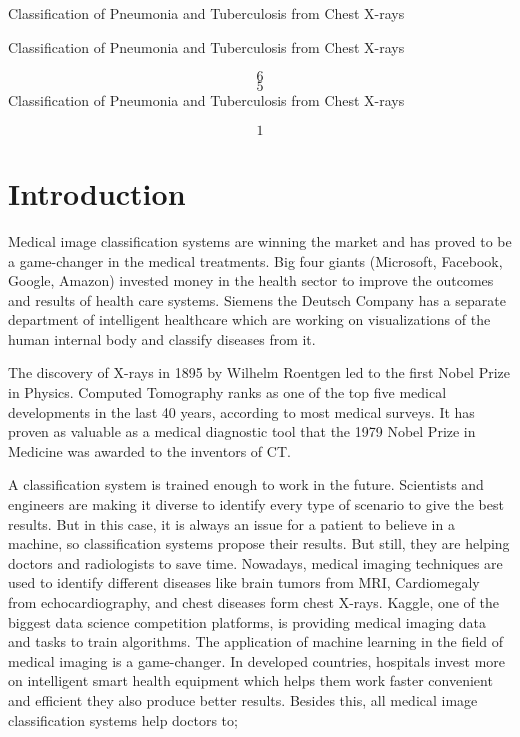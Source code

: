 \documentclass{article} %
\begin{document}
 Classification of Pneumonia and Tuberculosis from Chest X-rays

\noindent 

\noindent Classification of Pneumonia and Tuberculosis from Chest X-rays

\noindent 
\[6\] 
\[5\] 
Classification of Pneumonia and Tuberculosis from Chest X-rays

\noindent 
\[1\] 



\section{ Introduction}

\noindent Medical image classification systems are winning the market and has proved to be a game-changer in the medical treatments. Big four giants (Microsoft, Facebook, Google, Amazon) invested money in the health sector to improve the outcomes and results of health care systems. Siemens the Deutsch Company has a separate department of intelligent healthcare which are working on visualizations of the human internal body and classify diseases from it.

\noindent The discovery of X-rays in 1895 by Wilhelm Roentgen led to the first Nobel Prize in Physics. Computed Tomography ranks as one of the top five medical developments in the last 40 years, according to most medical surveys. It has proven as valuable as a medical diagnostic tool that the 1979 Nobel Prize in Medicine was awarded to the inventors of CT.

\noindent A classification system is trained enough to work in the future. Scientists and engineers are making it diverse to identify every type of scenario to give the best results. But in this case, it is always an issue for a patient to believe in a machine, so classification systems propose their results. But still, they are helping doctors and radiologists to save time. Nowadays, medical imaging techniques are used to identify different diseases like brain tumors from MRI, Cardiomegaly from echocardiography, and chest diseases form chest X-rays. Kaggle, one of the biggest data science competition platforms, is providing medical imaging data and tasks to train algorithms. The application of machine learning in the field of medical imaging is a game-changer. In developed countries, hospitals invest more on intelligent smart health equipment which helps them work faster convenient and efficient they also produce better results. Besides this, all medical image classification systems help doctors to;
\end{document}
